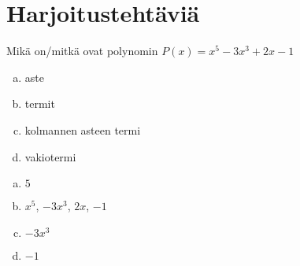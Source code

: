 \section{Harjoitustehtäviä}
\begin{tehtava}
	Mikä on/mitkä ovat polynomin $P(x) = x^5-3x^3+2x-1$
	\begin{enumerate}[a)]
		\item aste
		\item termit
		\item kolmannen asteen termi
		\item vakiotermi
	\end{enumerate}

	\begin{vastaus}
		\begin{enumerate}[a)]
			\item $5$
			\item $x^5$, $-3x^3$, $2x$, $-1$
			\item $-3x^3$
			\item $-1$
		\end{enumerate}
	\end{vastaus}
\end{tehtava}


